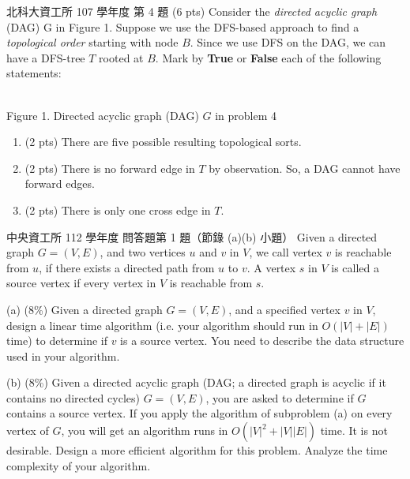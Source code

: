 \begin{pastexam}[label={px:tps-2}]{北科大資工所 107 學年度 第 4 題}
(6 pts) Consider the \emph{directed acyclic graph} (DAG) G in Figure 1. Suppose we use the DFS-based approach to find a \emph{topological order} starting with node $B$. Since we use DFS on the DAG, we can have a DFS-tree $T$ rooted at $B$. Mark by \textbf{True} or \textbf{False} each of the following statements:

\begin{center}
\\[2pt]
Figure 1. Directed acyclic graph (DAG) $G$ in problem 4\end{center}
\begin{enumerate}[label=(\arabic*)]
\item (2 pts) There are five possible resulting topological sorts.
\item (2 pts) There is no forward edge in $T$ by observation. So, a DAG cannot have forward edges.
\item (2 pts) There is only one cross edge in $T$.
\end{enumerate}
\end{pastexam}

\begin{pastexam}[label={px:tps-3}]{中央資工所 112 學年度 問答題第 1 題（節錄 (a)(b) 小題）}
Given a directed graph $G=(V,E)$, and two vertices $u$ and $v$ in $V$, we call vertex $v$ is reachable from $u$, if there exists a directed path from $u$ to $v$. A vertex $s$ in $V$ is called a source vertex if every vertex in $V$ is reachable from $s$.

(a) (8\%) Given a directed graph $G=(V,E)$, and a specified vertex $v$ in $V$, design a linear time algorithm (i.e. your algorithm should run in $O(|V|+|E|)$ time) to determine if $v$ is a source vertex. You need to describe the data structure used in your algorithm.

(b) (8\%) Given a directed acyclic graph (DAG; a directed graph is acyclic if it contains no directed cycles) $G=(V,E)$, you are asked to determine if $G$ contains a source vertex. If you apply the algorithm of subproblem (a) on every vertex of $G$, you will get an algorithm runs in $O(|V|^2+|V||E|)$ time. It is not desirable. Design a more efficient algorithm for this problem. Analyze the time complexity of your algorithm.
\end{pastexam}

